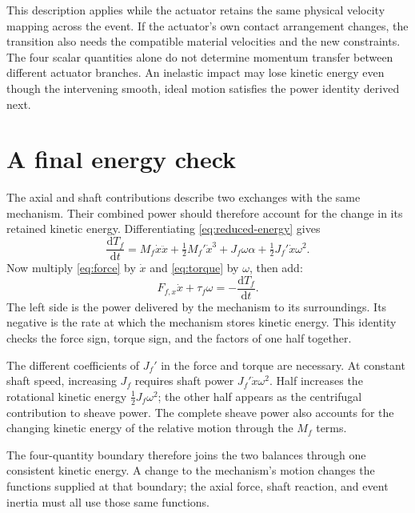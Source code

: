 \documentclass[11pt,letterpaper]{article}
\numberwithin{equation}{section}
\newcommand{\dd}{\mathrm{d}}
\newcommand{\half}{\tfrac12}
\begin{document}
This description applies while the actuator retains the same physical velocity mapping across the event. If the actuator's own contact arrangement changes, the transition also needs the compatible material velocities and the new constraints. The four scalar quantities alone do not determine momentum transfer between different actuator branches. An inelastic impact may lose kinetic energy even though the intervening smooth, ideal motion satisfies the power identity derived next.

\section{A final energy check}
\label{sec:energy}

The axial and shaft contributions describe two exchanges with the same mechanism. Their combined power should therefore account for the change in its retained kinetic energy. Differentiating \cref{eq:reduced-energy} gives
\begin{equation}
  \frac{\dd T_f}{\dd t}
   =M_f\dot x\ddot x+\half M_f'\dot x^3
     +J_f\omega\alpha+\half J_f'\dot x\omega^2.
  \label{eq:energy-derivative}
\end{equation}
Now multiply \cref{eq:force} by $\dot x$ and \cref{eq:torque} by $\omega$, then add:
\begin{equation}
  \boxed{F_{f,x}\dot x+\tau_f\omega
          =-\frac{\dd T_f}{\dd t}.}
  \label{eq:power}
\end{equation}
The left side is the power delivered by the mechanism to its surroundings. Its negative is the rate at which the mechanism stores kinetic energy. This identity checks the force sign, torque sign, and the factors of one half together.

The different coefficients of $J_f'$ in the force and torque are necessary. At constant shaft speed, increasing $J_f$ requires shaft power $J_f'\dot x\omega^2$. Half increases the rotational kinetic energy $\half J_f\omega^2$; the other half appears as the centrifugal contribution to sheave power. The complete sheave power also accounts for the changing kinetic energy of the relative motion through the $M_f$ terms.

The four-quantity boundary therefore joins the two balances through one consistent kinetic energy. A change to the mechanism's motion changes the functions supplied at that boundary; the axial force, shaft reaction, and event inertia must all use those same functions.
\end{document}

